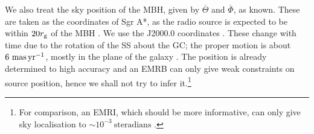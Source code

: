 We also treat the sky position of the MBH, given by $\overline{\Theta}$ and $\overline{\Phi}$, as known. These are taken as the coordinates of Sgr A*, as the radio source is expected to be within $20 r_\mathrm{g}$ of the MBH \citep{Reid2003,Doeleman2008}. We use the J2000.0 coordinates \citep{Reid1999, Yusef-Zadeh1999}. These change with time due to the rotation of the SS about the GC; the proper motion is about $6~\mathrm{mas\,yr^{-1}}$, mostly in the plane of the galaxy \citep{Reid1999, Backer1999, Reid2003}. The position is already determined to high accuracy and an EMRB can only give weak constraints on source position, hence we shall not try to infer it.\footnote{For comparison, an EMRI, which should be more informative, can only give sky localisation to $\sim 10^{-3}~\mathrm{steradians}$ \citep{Barack2004, Huerta2009}.}

